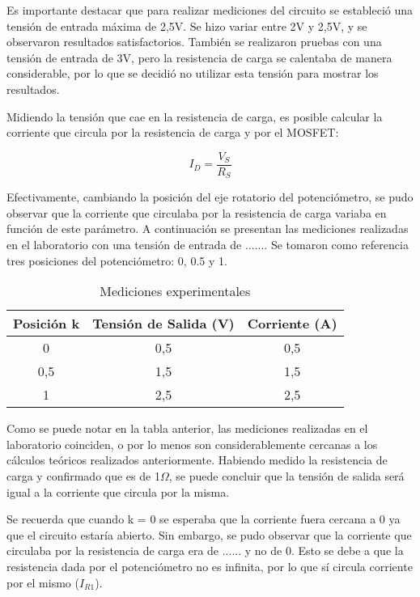 \documentclass[12pt,oneside,a4paper]{article}
\begin{document}
Es importante destacar que para realizar mediciones del circuito se estableció una tensión de entrada
máxima de 2,5V. Se hizo variar entre 2V y 2,5V, y se observaron resultados satisfactorios. También 
se realizaron pruebas con una tensión de entrada de 3V, pero la resistencia de carga se calentaba
de manera considerable, por lo que se decidió no utilizar esta tensión para mostrar los resultados.

Midiendo la tensión que cae en la resistencia de carga, es posible calcular la corriente que circula 
por la resistencia de carga y por el MOSFET:

\begin{equation}
    I_D = \frac{V_S}{R_S}
\end{equation}

Efectivamente, cambiando la posición del eje rotatorio del potenciómetro, se pudo observar que la 
corriente que circulaba por la resistencia de carga variaba en función de este parámetro. A continuación
se presentan las mediciones realizadas en el laboratorio con una tensión de entrada de .......
Se tomaron como referencia tres posiciones 
del potenciómetro: 0, 0.5 y 1.

\begin{table}[H]
    \centering
    \begin{tabular}{|c|c|c|}
        \hline
        \rowcolor[HTML]{C0C0C0} 
        \hline
        \textbf{Posición k} & \textbf{Tensión de Salida (V)} & \textbf{Corriente (A)} \\ \hline
        0        & 0,5                   & 0,5           \\ \hline
        0,5      & 1,5                   & 1,5           \\ \hline
        1        & 2,5                   & 2,5           \\ \hline
    \end{tabular}
    \caption{Mediciones experimentales}
\end{table}

Como se puede notar en la tabla anterior, las mediciones realizadas en el laboratorio coinciden, o por lo 
menos son considerablemente cercanas a los cálculos teóricos realizados anteriormente. Habiendo medido 
la resistencia de carga y confirmado que es de 1$\Omega$, se puede concluir que la tensión de salida 
será igual a la corriente que circula por la misma. 

Se recuerda que cuando k = 0 se esperaba que la corriente 
fuera cercana a 0 ya que el circuito estaría abierto. Sin embargo, se pudo observar que la corriente 
que circulaba por la resistencia de carga era de ...... y no de 0. Esto se debe a que la resistencia 
dada por el potenciómetro no es infinita, por lo que sí circula corriente por el mismo ($I_{R1}$).
\end{document}

